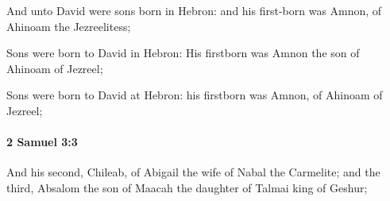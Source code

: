 			\begin{versebox}
					\item[BHS] 
					\item[ASV] And unto David were sons born in Hebron: and his first-born was Amnon, of Ahinoam the Jezreelitess;
					\item[NIV] Sons were born to David in Hebron: His firstborn was Amnon the son of Ahinoam of Jezreel;
					\item[NRSV] Sons were born to David at Hebron: his firstborn was Amnon, of Ahinoam of Jezreel;
			\end{versebox}

		\paragraph{2 Samuel 3:3} %
			\label{2SAMUEL-3-3}

			And his second, Chileab, of Abigail the wife of Nabal the Carmelite; and the third, Absalom the son of Maacah the daughter of Talmai king of Geshur;

